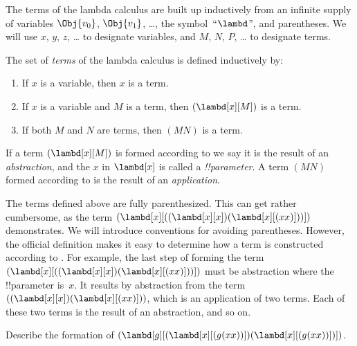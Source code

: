 \documentclass[../../../include/open-logic-section]{subfiles}
\begin{document}

The terms of the lambda calculus are built up inductively from an
infinite supply of variables $\Obj{v_0}$, $\Obj{v_1}$, \dots, the
symbol~``$\lambd$'', and parentheses. We will use $x$, $y$, $z$, \dots{}
to designate variables, and $M$, $N$, $P$, \dots{} to designate terms.

\begin{defn}[Terms] 
The set of \emph{terms} of the lambda calculus is defined inductively by:
\begin{enumerate}
  \item {} If $x$ is a variable, then $x$ is a
    term.
  \item {} If $x$ is a variable and $M$ is a
    term, then $(\lambd[x][M])$ is a term.
  \item {} If both $M$ and $N$ are terms, then
    $(MN)$ is a term.
\end{enumerate}
\end{defn}

If a term $(\lambd[x][M])$ is formed according to
 we say it is the result of an
\emph{abstraction}, and the $x$ in $\lambd[x]$ is called a
\emph{!!{parameter}}.  A term $(MN)$ formed according to
 is the result of an \emph{application}.

The terms defined above are fully parenthesized. This can get rather
cumbersome, as the term
$(\lambd[x][((\lambd[x][x])(\lambd[x][(xx)]))])$ demonstrates. We will
introduce conventions for avoiding parentheses.  However, the official
definition makes it easy to determine how a term is constructed
according to . For example, the last step of forming
the term $(\lambd[x][((\lambd[x][x])(\lambd[x][(xx)]))])$ must be
abstraction where the !!{parameter} is~$x$. It results by abstraction
from the term $((\lambd[x][x])(\lambd[x][(xx)]))$, which is an
application of two terms. Each of these two terms is the result of an
abstraction, and so on.

\begin{prob}
Describe the formation of $(\lambd[g][(\lambd[x][(g (x x))])
  (\lambd[x][(g (x x))])])$.
\end{prob}
\end{document}
